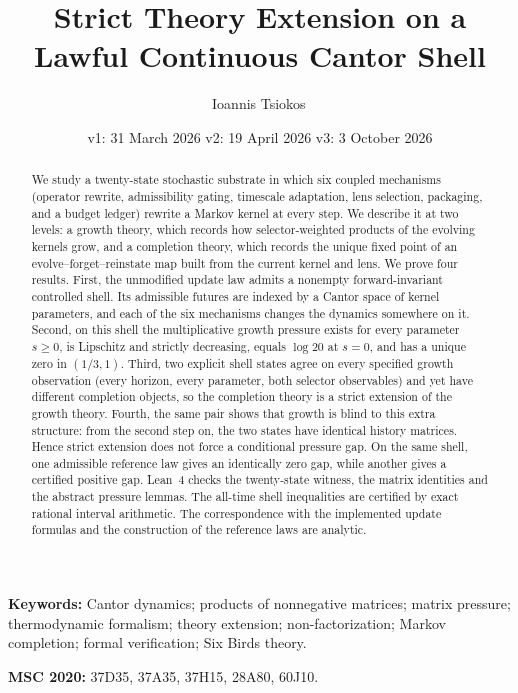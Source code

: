 \title{Strict Theory Extension on a\\Lawful Continuous Cantor Shell}
\author{Ioannis Tsiokos\,}
\date{v1: 31 March 2026 \quad\textperiodcentered\quad v2: 19 April 2026 \quad\textperiodcentered\quad v3: 3 October 2026}

\maketitle
\thispagestyle{firstpage}

\begin{abstract}
We study a twenty-state stochastic substrate in which six coupled mechanisms (operator rewrite, admissibility gating, timescale adaptation, lens selection, packaging, and a budget ledger) rewrite a Markov kernel at every step. We describe it at two levels: a growth theory, which records how selector-weighted products of the evolving kernels grow, and a completion theory, which records the unique fixed point of an evolve--forget--reinstate map built from the current kernel and lens. We prove four results. First, the unmodified update law admits a nonempty forward-invariant controlled shell. Its admissible futures are indexed by a Cantor space of kernel parameters, and each of the six mechanisms changes the dynamics somewhere on it. Second, on this shell the multiplicative growth pressure exists for every parameter $s\ge 0$, is Lipschitz and strictly decreasing, equals $\log 20$ at $s=0$, and has a unique zero in $(1/3,1)$. Third, two explicit shell states agree on every specified growth observation (every horizon, every parameter, both selector observables) and yet have different completion objects, so the completion theory is a strict extension of the growth theory. Fourth, the same pair shows that growth is blind to this extra structure: from the second step on, the two states have identical history matrices. Hence strict extension does not force a conditional pressure gap. On the same shell, one admissible reference law gives an identically zero gap, while another gives a certified positive gap. Lean~4 checks the twenty-state witness, the matrix identities and the abstract pressure lemmas. The all-time shell inequalities are certified by exact rational interval arithmetic. The correspondence with the implemented update formulas and the construction of the reference laws are analytic.
\end{abstract}

\smallskip

\noindent\textbf{Keywords:} Cantor dynamics; products of nonnegative matrices; matrix pressure; thermodynamic formalism; theory extension; non-factorization; Markov completion; formal verification; Six Birds theory.

\smallskip

\noindent\textbf{MSC 2020:} 37D35, 37A35, 37H15, 28A80, 60J10.
